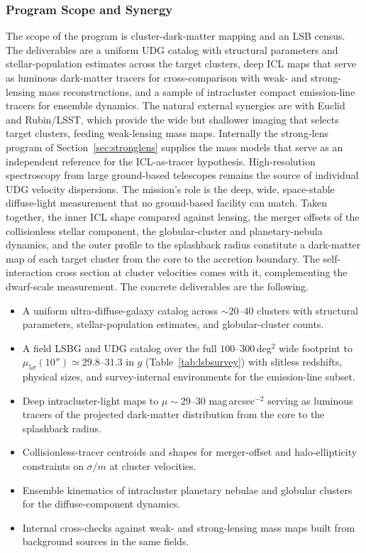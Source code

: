 \subsubsection{Program Scope and Synergy}

The scope of the program is cluster-dark-matter mapping and an LSB census. The deliverables are a uniform UDG catalog with structural parameters and stellar-population estimates across the target clusters, deep ICL maps that serve as luminous dark-matter tracers for cross-comparison with weak- and strong-lensing mass reconstructions, and a sample of intracluster compact emission-line tracers for ensemble dynamics. The natural external synergies are with Euclid and Rubin/LSST, which provide the wide but shallower imaging that selects target clusters, feeding weak-lensing mass maps. Internally the strong-lens program of Section~\ref{sec:stronglens} supplies the mass models that serve as an independent reference for the ICL-as-tracer hypothesis. High-resolution spectroscopy from large ground-based telescopes remains the source of individual UDG velocity dispersions. The mission's role is the deep, wide, space-stable diffuse-light measurement that no ground-based facility can match. Taken together, the inner ICL shape compared against lensing, the merger offsets of the collisionless stellar component, the globular-cluster and planetary-nebula dynamics, and the outer profile to the splashback radius constitute a dark-matter map of each target cluster from the core to the accretion boundary. The self-interaction cross section at cluster velocities comes with it, complementing the dwarf-scale measurement. The concrete deliverables are the following.
\begin{itemize}[leftmargin=1.4em,itemsep=1pt,topsep=2pt]
\item A uniform ultra-diffuse-galaxy catalog across $\sim20$--$40$ clusters with structural parameters, stellar-population estimates, and globular-cluster counts.
\item A field LSBG and UDG catalog over the full $100$--$300$\,deg$^2$ wide footprint to $\mu_{5\sigma}(10'')\simeq29.8$--$31.3$ in $g$ (Table~\ref{tab:lsbsurvey}) with slitless redshifts, physical sizes, and survey-internal environments for the emission-line subset.
\item Deep intracluster-light maps to $\mu\sim29$--$30$ mag\,arcsec$^{-2}$ serving as luminous tracers of the projected dark-matter distribution from the core to the splashback radius.
\item Collisionless-tracer centroids and shapes for merger-offset and halo-ellipticity constraints on $\sigma/m$ at cluster velocities.
\item Ensemble kinematics of intracluster planetary nebulae and globular clusters for the diffuse-component dynamics.
\item Internal cross-checks against weak- and strong-lensing mass maps built from background sources in the same fields.
\end{itemize}

